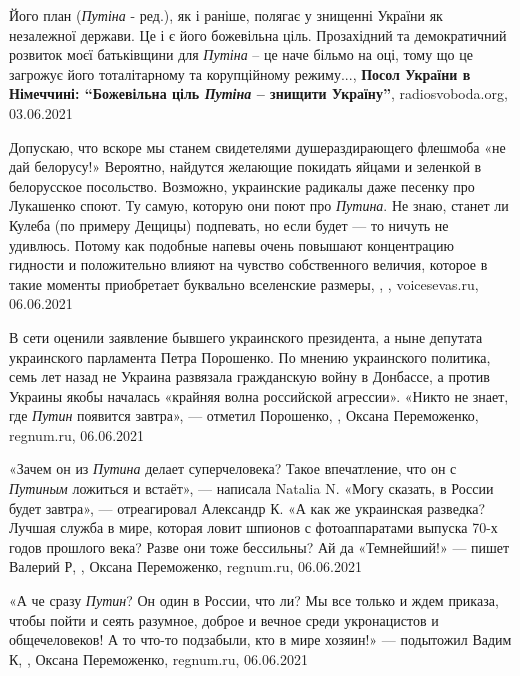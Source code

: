 Його план (\emph{Путіна} - ред.), як і раніше, полягає у знищенні України як
незалежної держави. Це і є його божевільна ціль. Прозахідний та демократичний
розвиток моєї батьківщини для \emph{Путіна} – це наче більмо на оці, тому що це
загрожує його тоталітарному та корупційному режиму..., 
\textbf{Посол України в Німеччині: \enquote{Божевільна ціль \emph{Путіна} – знищити Україну}},
radiosvoboda.org, 03.06.2021

Допускаю, что вскоре мы станем свидетелями душераздирающего флешмоба «не дай
белорусу!» Вероятно, найдутся желающие покидать яйцами и зеленкой в белорусское
посольство.  Возможно, украинские радикалы даже песенку про Лукашенко споют. Ту
самую, которую они поют про \emph{Путина}. Не знаю, станет ли Кулеба (по
примеру Дещицы) подпевать, но если будет — то ничуть не удивлюсь. Потому как
подобные напевы очень повышают концентрацию гидности и положительно влияют на
чувство собственного величия, которое в такие моменты приобретает буквально
вселенские размеры,
, , voicesevas.ru, 06.06.2021

В сети оценили заявление бывшего украинского президента, а ныне депутата
украинского парламента Петра Порошенко. По мнению украинского политика, семь
лет назад не Украина развязала гражданскую войну в Донбассе, а против Украины
якобы началась «крайняя волна российской агрессии». «Никто не знает, где \emph{Путин}
появится завтра», — отметил Порошенко,
, Оксана Переможенко, regnum.ru, 06.06.2021

«Зачем он из \emph{Путина} делает суперчеловека? Такое впечатление, что он с \emph{Путиным}
ложиться и встаёт», — написала Natalia N.  «Могу сказать, в России будет
завтра», — отреагировал Александр К.  «А как же украинская разведка? Лучшая
служба в мире, которая ловит шпионов с фотоаппаратами выпуска 70-х годов
прошлого века? Разве они тоже бессильны? Ай да «Темнейший!» — пишет Валерий Р,
, Оксана Переможенко, regnum.ru, 06.06.2021

«А че сразу \emph{Путин}? Он один в России, что ли? Мы все только и ждем приказа,
чтобы пойти и сеять разумное, доброе и вечное среди укронацистов и
общечеловеков! А то что-то подзабыли, кто в мире хозяин!» — подытожил Вадим К,
, Оксана Переможенко, regnum.ru, 06.06.2021

